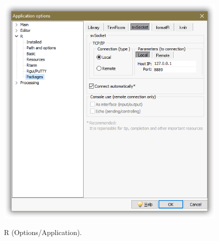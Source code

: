\begin{figure}[h!]
  \includegraphics[scale=0.33]{./res/app_r_packages_svsocket.png}\\
  \caption{R (Options/Application).}
  \label{fig:app_r_b}
\end{figure}

